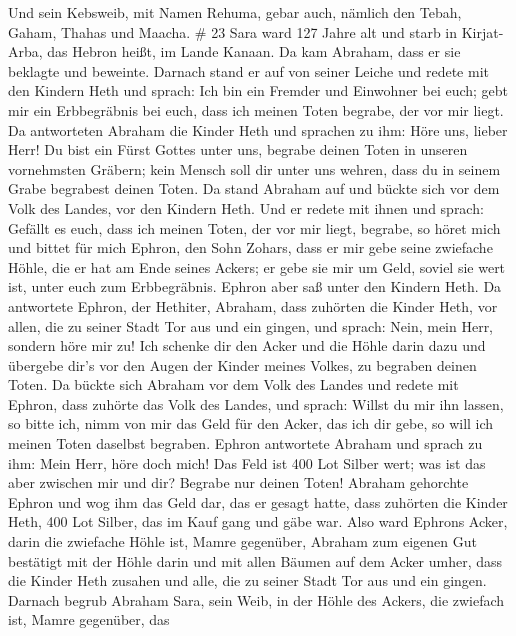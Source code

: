 Und sein Kebsweib, mit Namen Rehuma, gebar auch, nämlich
den Tebah, Gaham, Thahas und Maacha. \# 23  Sara ward 127
Jahre alt  und starb in Kirjat-Arba, das Hebron heißt, im
Lande Kanaan. Da kam Abraham, dass er sie beklagte und beweinte.
 Darnach stand er auf von seiner Leiche und redete mit den
Kindern Heth und sprach:  Ich bin ein Fremder und Einwohner
bei euch; gebt mir ein Erbbegräbnis bei euch, dass ich meinen Toten
begrabe, der vor mir liegt.  Da antworteten Abraham die
Kinder Heth und sprachen zu ihm:  Höre uns, lieber Herr! Du
bist ein Fürst Gottes unter uns, begrabe deinen Toten in unseren
vornehmsten Gräbern; kein Mensch soll dir unter uns wehren, dass du in
seinem Grabe begrabest deinen Toten.  Da stand Abraham auf
und bückte sich vor dem Volk des Landes, vor den Kindern Heth.
 Und er redete mit ihnen und sprach: Gefällt es euch, dass
ich meinen Toten, der vor mir liegt, begrabe, so höret mich und bittet
für mich Ephron, den Sohn Zohars,  dass er mir gebe seine
zwiefache Höhle, die er hat am Ende seines Ackers; er gebe sie mir um
Geld, soviel sie wert ist, unter euch zum Erbbegräbnis. 
Ephron aber saß unter den Kindern Heth. Da antwortete Ephron, der
Hethiter, Abraham, dass zuhörten die Kinder Heth, vor allen, die zu
seiner Stadt Tor aus und ein gingen, und sprach:  Nein,
mein Herr, sondern höre mir zu! Ich schenke dir den Acker und die Höhle
darin dazu und übergebe dir's vor den Augen der Kinder meines Volkes, zu
begraben deinen Toten.  Da bückte sich Abraham vor dem Volk
des Landes  und redete mit Ephron, dass zuhörte das Volk
des Landes, und sprach: Willst du mir ihn lassen, so bitte ich, nimm von
mir das Geld für den Acker, das ich dir gebe, so will ich meinen Toten
daselbst begraben.  Ephron antwortete Abraham und sprach zu
ihm:  Mein Herr, höre doch mich! Das Feld ist 400 Lot
Silber wert; was ist das aber zwischen mir und dir? Begrabe nur deinen
Toten!  Abraham gehorchte Ephron und wog ihm das Geld dar,
das er gesagt hatte, dass zuhörten die Kinder Heth, 400 Lot Silber, das
im Kauf gang und gäbe war.  Also ward Ephrons Acker, darin
die zwiefache Höhle ist, Mamre gegenüber, Abraham zum eigenen Gut
bestätigt mit der Höhle darin und mit allen Bäumen auf dem Acker umher,
 dass die Kinder Heth zusahen und alle, die zu seiner Stadt
Tor aus und ein gingen.  Darnach begrub Abraham Sara, sein
Weib, in der Höhle des Ackers, die zwiefach ist, Mamre gegenüber, das
